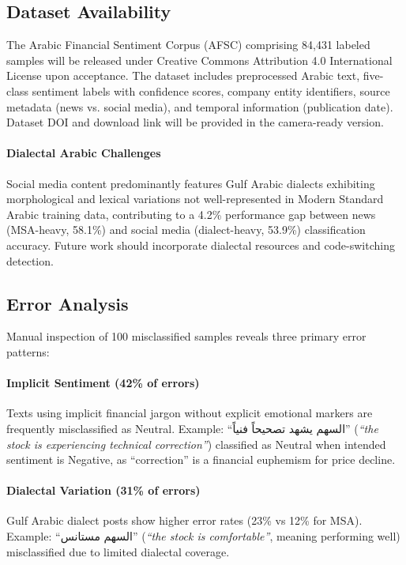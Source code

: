 \documentclass[10pt,a4paper]{article}
\begin{document}
\subsection{Dataset Availability}

The Arabic Financial Sentiment Corpus (AFSC) comprising 84,431 labeled samples will be released under Creative Commons Attribution 4.0 International License upon acceptance. The dataset includes preprocessed Arabic text, five-class sentiment labels with confidence scores, company entity identifiers, source metadata (news vs. social media), and temporal information (publication date). Dataset DOI and download link will be provided in the camera-ready version.

\paragraph{Dialectal Arabic Challenges}
Social media content predominantly features Gulf Arabic dialects exhibiting morphological and lexical variations not well-represented in Modern Standard Arabic training data, contributing to a 4.2\% performance gap between news (MSA-heavy, 58.1\%) and social media (dialect-heavy, 53.9\%) classification accuracy. Future work should incorporate dialectal resources and code-switching detection.

\subsection{Error Analysis}

Manual inspection of 100 misclassified samples reveals three primary error patterns:

\paragraph{Implicit Sentiment (42\% of errors)} Texts using implicit financial jargon without explicit emotional markers are frequently misclassified as Neutral. Example:
\small
``\textarabic{السهم يشهد تصحيحاً فنياً}'' (\textit{``the stock is experiencing technical correction''}) classified as Neutral when intended sentiment is Negative, as ``correction'' is a financial euphemism for price decline.

\paragraph{Dialectal Variation (31\% of errors)} Gulf Arabic dialect posts show higher error rates (23\% vs 12\% for MSA). Example:
\small
``\textarabic{السهم مستانس}'' (\textit{``the stock is comfortable''}, meaning performing well) misclassified due to limited dialectal coverage.
\end{document}
